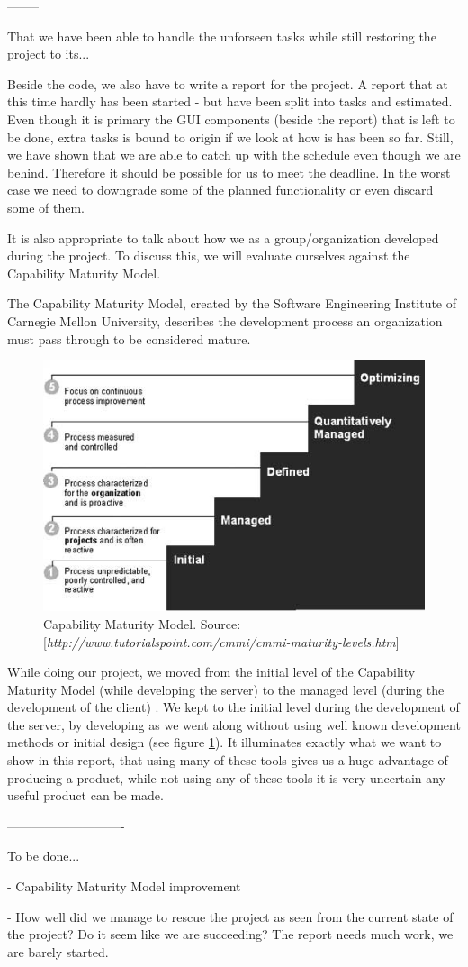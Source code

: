 --------

That we have been able to handle the unforseen tasks while still restoring the project to its...

Beside the code, we also have to write a report for the project. A report that at this time hardly has been started - but have been split into tasks and estimated.
Even though it is primary the GUI components (beside the report) that is left to be done, extra tasks is bound to origin if we look at how is has been so far. Still, we have shown that we are able to catch up with the schedule even though we are behind. Therefore it should be possible for us to meet the deadline. In the worst case we need to downgrade some of the planned functionality or even discard some of them.

It is also appropriate to talk about how we as a group/organization developed during the project. To discuss this, we will evaluate ourselves against the Capability Maturity Model.

The Capability Maturity Model, created by the Software Engineering Institute of Carnegie Mellon University, describes the development process an organization must pass through to be considered mature.

\begin{figure}[t]
  \includegraphics[width=\textwidth]{illustrations/CMM.jpg}
  \caption{Capability Maturity Model. Source: [\textit{http://www.tutorialspoint.com/cmmi/cmmi-maturity-levels.htm}]}
  \label{fig:Capability_Maturity_Model}
\end{figure}

While doing our project, we moved from the initial level of the Capability Maturity Model (while developing the server) to the managed level (during the development of the client) \cite[p. 242]{PM}. We kept to the initial level during the development of the server, by developing as we went along without using well known development methods or initial design (see figure \ref{fig:Capability_Maturity_Model}). It illuminates exactly what we want to show in this report, that using many of these tools gives us a huge advantage of producing a product, while not using any of these tools it is very uncertain any useful product can be made.

----------------------------

To be done...

- Capability Maturity Model improvement

- How well did we manage to rescue the project as seen from the current state of the project? Do it seem like we are succeeding? The report needs much work, we are barely started.
\newpage